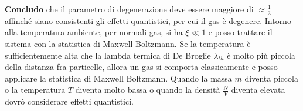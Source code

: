 \textbf{Concludo} che il parametro di degenerazione deve essere maggiore di $\approx \frac{1}{3}$ affinché siano consistenti gli effetti quantistici, per cui il gas è degenere.
Intorno alla temperatura ambiente, per normali gas, si ha $\xi \ll 1$ e posso trattare il sistema con la statistica di Maxwell Boltzmann.
Se la temperatura è sufficientemente alta che la lambda termica di De Broglie $\lambda_{th}$ è molto più piccola della distanza fra particelle, allora un gas si comporta classicamente e posso applicare la statistica di Maxwell Boltzmann. 
Quando la massa $m$ diventa piccola o la temperatura $T$ diventa molto bassa o quando la densità $\frac{N}{V}$ diventa elevata dovrò considerare effetti quantistici.











